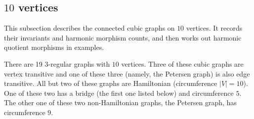 \documentclass[12pt,letterpaper]{article}
\theoremstyle{definition}
\begin{document}
\subsection{\texorpdfstring{$10$}{10} vertices}

This subsection describes the connected cubic graphs on $10$ vertices.
It records their invariants and harmonic morphism counts, and then
works out harmonic quotient morphisms in examples.

\label{subsec:d3reg10}

There are 19 $3$-regular graphs with $10$ vertices.
Three of these cubic graphs are vertex transitive and one of these
three (namely, the Petersen graph) is also edge transitive.
All but two of these graphs are Hamiltonian (circumference $|V|=10$).
One of these two has a bridge (the first one listed below)
and circumference $5$.
The other one of these two non-Hamiltonian graphs,
the Petersen graph, has circumference $9$.
\end{document}
